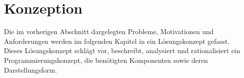 \chapter{Konzeption}\label{chapter:konzeption}
Die im vorherigen Abschnitt dargelegten Probleme, Motivationen und Anforderungen werden im folgenden Kapitel in ein Lösungskonzept gefasst. Dieses Lösungskonzept schlägt vor, beschreibt, analysiert und rationalisiert ein Programmierungskonzept, die benötigten Komponenten sowie deren Darstellungsform.





